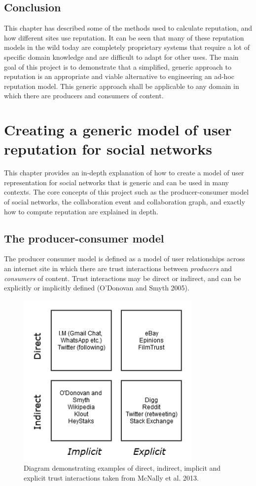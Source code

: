\documentclass[]{final_report}
\begin{document}
\section{Conclusion}

This chapter has described some of the methods used to calculate reputation, and how different sites use reputation. It can be seen that many of these reputation models in the wild today are completely proprietary systems that require a lot of specific domain knowledge and are difficult to adapt for other uses. The main goal of this project is to demonstrate that a simplified, generic approach to reputation is an appropriate and viable alternative to engineering an ad-hoc reputation model. This generic approach shall be applicable to any domain in which there are producers and consumers of content.

\chapter{Creating a generic model of user reputation for social networks}
This chapter provides an in-depth explanation of how to create a model of user representation for social networks that is generic and can be used in many contexts. The core concepts of this project such as the producer-consumer model of social networks, the collaboration event and collaboration graph, and exactly how to compute reputation are explained in depth.

\section{The producer-consumer model}

The producer consumer model is defined as a model of user relationships across an internet site in which there are trust interactions between \textsl{producers} and \textsl{consumers} of content. Trust interactions may be direct or indirect, and can be explicitly or implicitly defined (O'Donovan and Smyth 2005).

\begin{figure}[ht!]
\centering
\includegraphics[width=90mm]{chap3/trusttypes.png}
\caption{Diagram demonstrating examples of direct, indirect, implicit and explicit trust interactions taken from McNally et al. 2013.}
\end{figure}\label{gra:trusttypes}
\end{document}
